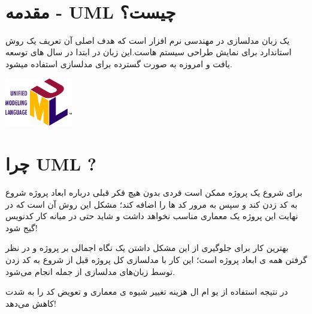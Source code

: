 \documentclass[]{article}
\begin{document}
\newpage
\pagestyle{fancy}
\fancyhf{}
\fancyfoot{}
\cfoot{\thepage}
\renewcommand{\headrulewidth}{2pt}

\KashidaOff


 \Large \textbf{\\
}


\section*{{\titr مقدمه - UML چیست؟}}

 یک زبان مدلسازی در مهندسی نرم افزار است که هدف اصلی آن تعریف یک روش استاندارد برای نمایش طراحی سیستم هاست.این زبان در ابتدا در سال های   توسعه یافت و امروزه به صورت گسترده برای مدلسازی استفاده میشود.

\begin{center}

\includegraphics[width=0.22\textwidth]{images/image4.png}

\end{center}



\section*{{\titr چرا UML ?}}

برای شروع یک پروژه ممکن است فردی بدون هیچ فکر قبلی درباره ابعاد پروژه شروع به کد زدن کند و سپس به مرور کد ها را اضافه کند؛ مشکل این روش آن است که در نهایت این پروژه یک معماری مناسب نخواهد داشت و شاید حتی در میانه کار کدنویس گیج شود!

 بهترین کار برای جلوگیری از این مشکل داشتن یک نگاه اجمالی بر پروژه  و در نظر گرفتن همه ی ابعاد پروژه است؛ این کار با مدلسازی کل پروژه قبل از شروع به کد زدن توسط زبان‌های مدلسازی از جمله  انجام می‌شود.
 
در نتیجه استفاده از یو ام ال هزینه تغییر شیوه ی معماری و تعویض کد را به شدت کاهش می‌دهد!
\end{document}
